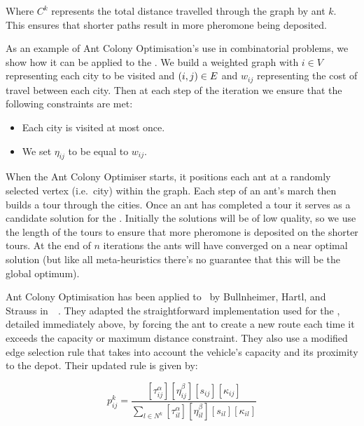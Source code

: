 Where $C^k$ represents the total distance travelled through the graph by ant $k$. This ensures that shorter paths result in more pheromone being deposited.

As an example of Ant Colony Optimisation's use in combinatorial problems, we show how it can be applied to the \TSP. We build a weighted graph with $i \in V$ representing each city to be visited and $(i,j) \in E$ and $w_{ij}$ representing the cost of travel between each city. Then at each step of the iteration we ensure that the following constraints are met:

\begin{itemize}
   \item Each city is visited at most once.
   \item We set $\eta_{ij}$ to be equal to $w_{ij}$.
\end{itemize}

When the Ant Colony Optimiser starts, it positions each ant at a randomly selected vertex (i.e.~city) within the graph. Each step of an ant's march then builds a tour through the cities. Once an ant has completed a tour it serves as a candidate solution for the \TSP. Initially the solutions will be of low quality, so we use the length of the tours to ensure that more pheromone is deposited on the shorter tours. At the end of $n$ iterations the ants will have converged on a near optimal solution (but like all meta-heuristics there's no guarantee that this will be the global optimum).

 
Ant Colony Optimisation has been applied to \VRP\ by Bullnheimer, Hartl, and Strauss in~\cite{BHS:1999A}~\cite{BHS:1999B}. They adapted the straightforward implementation used for the \TSP, detailed immediately above, by forcing the ant to create a new route each time it exceeds the capacity or maximum distance constraint. They also use a modified edge selection rule that takes into account the vehicle's capacity and its proximity to the depot. Their updated rule is given by:

\[
   p_{ij}^k = \frac{ [\tau_{ij}^{\alpha}] [\eta_{ij}^{\beta}] [s_{ij}] [\kappa_{ij}]  }{ \sum_{l \in N^k} [\tau_{il}^{\alpha}] [\eta_{il}^{\beta}] [s_{il}] [\kappa_{il}] }
\]

